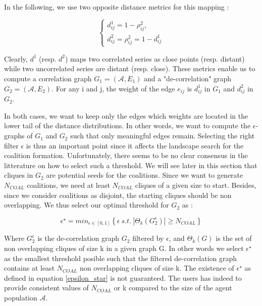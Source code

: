 \documentclass[conference]{IEEEtran}
\begin{document}
In the following, we use two opposite distance metrics for this mapping : 

\begin{equation}
\left\{ \begin{array}{lll}
			d_{ij}^{1} = 1 - \rho_{ij}^{2}, \\
			d_{ij}^{2} = \rho_{ij}^{2} = 1 - d_{ij}^{1}
\end{array} \right.
\end{equation}

Clearly, $ d^{1} $ (resp. $ d^{2} $) maps two correlated series as close points (resp. distant) while two uncorrelated series are distant (resp. close). These metrics enable us to compute a correlation graph $ G_{1} = (\mathcal{A}, E_{1}) $ and a "de-correlation" graph $ G_{2} = (\mathcal{A}, E_{2} ) $. For any i and j, the weight of the edge $ e_{ij} $ is $ d_{ij}^{1} $ in $ G_{1} $ and $ d_{ij}^{2} $ in $ G_{2} $.

In both cases, we want to keep only the edges which weights are located in the lower tail of the distance distributions. In other words, we want to compute the $ \epsilon$-graphs of $ G_{1} $ and $ G_{2} $ such that only meaningful edges remain. Selecting the right filter $ \epsilon $ is thus an important point since it affects the landscape search for the coalition formation. Unfortunately, there seems to be no clear consensus in the litterature on how to select such a threshold. We will see later in this section that cliques in $ G_{2} $ are potential seeds for the coalitions. Since we want to generate $ N_{COAL} $ coalitions, we need at least $ N_{COAL} $ cliques of a given size to start. Besides, since we consider coalitions as disjoint, the starting cliques should be non overlapping. We thus select our optimal threshold for $ G_{2} $ as :

\begin{equation}
\label{epsilon_star}
\epsilon^{\star} = min_{ \epsilon \in [0,1]} \left\{ \epsilon\ s.t.\ |\Theta_{k}(G_{2}^{\epsilon})| \geq N_{COAL} \right\}
\end{equation} 

Where $ G_{2}^{\epsilon} $ is the de-correlation graph $ G_{2} $ filtered by $ \epsilon $, and $ \Theta_{k}(G) $ is the set of non overlapping cliques of size k in a given graph G. In other words we select $ \epsilon^{\star} $ as the smallest threshold posible such that the filtered de-correlation graph contains at least $ N_{COAL} $ non overlapping cliques of size k. The existence of $ \epsilon^{\star} $  as defined in equation  \ref{epsilon_star} is not guaranteed. The users has indeed to provide consistent values of $ N_{COAL} $ or k compared to the size of the agent population $ \mathcal{A} $. \\
\end{document}
